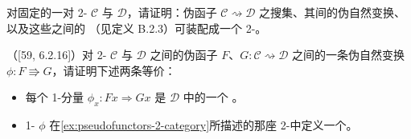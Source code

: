 \begin{exercise}\label{ex:pseudofunctors-2-category}
对固定的一对 2-\trCategory{} $\mathcal{C}$ 与 $\mathcal{D}$，请证明：伪函子
$\mathcal{C}\rightsquigarrow\mathcal{D}$ 之搜集、其间的伪自然变换、以及这些之间的%
\trModification{}（见定义 B.2.3）可装配成一个 2-\trCategory。
\end{exercise}

\begin{exercise}\label{ex:pseudonatural-equivalence-characterization}
（[59, 6.2.16]）对 2-\trCategory{} $\mathcal{C}$ 与 $\mathcal{D}$ 之间的伪函子
$F$、$G\colon\mathcal{C}\rightsquigarrow\mathcal{D}$ 之间的一条伪自然变换
$\phi\colon F\Rrightarrow G$，请证明下述两条等价：
\begin{itemize}
\item 每个 1-\trCell{}分量 $\phi_{x}\colon Fx\Rightarrow Gx$ 是 $\mathcal{D}$ 中的一个%
\trEquivalence。
\item 1-\trCell{} $\phi$ 在\cref{ex:pseudofunctors-2-category}所描述的那座
2-\trCategory{}中定义一个\trEquivalence。
\end{itemize}
\end{exercise}

